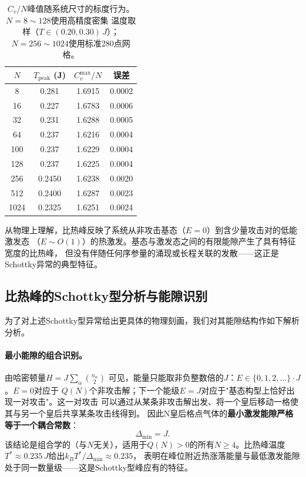 \begin{table}[htbp]
  \centering
  \caption{$C_{v}/N$峰值随系统尺寸的标度行为。$N=8\sim128$使用高精度密集
  温度取样（$T\in(0.20,0.30)\,J$）；$N=256\sim1024$使用标准280点网格。}
  \label{tab:cv_peak}
  \begin{tabular}{cccc}
    \toprule
    $N$ & $T_{\text{peak}}$ (J) & $C_{v}^{\max}/N$ & 误差 \\
    \midrule
    8    & 0.281  & 1.6915 & 0.0002 \\
    16   & 0.227  & 1.6783 & 0.0006 \\
    32   & 0.231  & 1.6288 & 0.0005 \\
    64   & 0.237  & 1.6216 & 0.0004 \\
    100  & 0.237  & 1.6229 & 0.0004 \\
    128  & 0.237  & 1.6225 & 0.0004 \\
    256  & 0.2450 & 1.6238 & 0.0020 \\
    512  & 0.2400 & 1.6287 & 0.0023 \\
    1024 & 0.2325 & 1.6251 & 0.0024 \\
    \bottomrule
  \end{tabular}
\end{table}

从物理上理解，比热峰反映了系统从非攻击基态（$E=0$）到含少量攻击对的低能激发态
（$E\sim O(1)$）的热激发。基态与激发态之间的有限能隙产生了具有特征宽度的比热峰，
但没有伴随任何序参量的涌现或长程关联的发散——这正是Schottky异常的典型特征。

\subsection*{比热峰的Schottky型分析与能隙识别}

为了对上述Schottky型异常给出更具体的物理刻画，我们对其能隙结构作如下解析分析。

\paragraph{最小能隙的组合识别。}由哈密顿量$H=J\sum_{\alpha}\binom{n_{\alpha}}{2}$
可见，能量只能取非负整数倍的$J$：$E\in\{0,1,2,\ldots\}\cdot J$。$E=0$对应于
$Q(N)$个非攻击解；下一个能级$E=J$对应于"基态构型上恰好出现一对攻击"。这一对攻击
可以通过从某条非攻击解出发、将一个皇后移动一格使其与另一个皇后共享某条攻击线得到。
因此N皇后格点气体的\textbf{最小激发能隙严格等于一个耦合常数}：
%
\begin{equation}
  \Delta_{\min} = J.
  \label{eq:gap}
\end{equation}
%
该结论是组合学的（与$N$无关），适用于$Q(N)>0$的所有$N\ge 4$。比热峰温度
$T^{\ast}\approx 0.235\,J$给出$k_{B}T^{\ast}/\Delta_{\min}\approx 0.235$，
表明在峰位附近热涨落能量与最低激发能隙处于同一数量级——这是Schottky型峰应有的特征。

